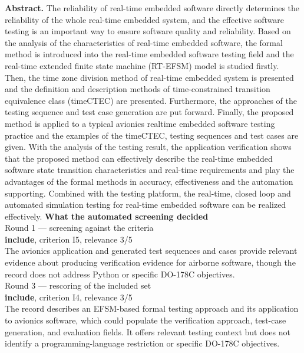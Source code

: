 \documentclass[11pt,a4paper]{article}
\begin{document}
{\small\textbf{Abstract.} The reliability of real-time embedded software directly determines the reliability of the whole real-time embedded system, and the effective software testing is an important way to ensure software quality and reliability. Based on the analysis of the characteristics of real-time embedded software, the formal method is introduced into the real-time embedded software testing field and the real-time extended finite state machine (RT-EFSM) model is studied firstly. Then, the time zone division method of real-time embedded system is presented and the definition and description methods of time-constrained transition equivalence class (timeCTEC) are presented. Furthermore, the approaches of the testing sequence and test case generation are put forward. Finally, the proposed method is applied to a typical avionics realtime embedded software testing practice and the examples of the timeCTEC, testing sequences and test cases are given. With the analysis of the testing result, the application verification shows that the proposed method can effectively describe the real-time embedded software state transition characteristics and real-time requirements and play the advantages of the formal methods in accuracy, effectiveness and the automation supporting. Combined with the testing platform, the real-time, closed loop and automated simulation testing for real-time embedded software can be realized effectively.}
\vspace{3mm}
\vspace{2.5mm}
{\small\textbf{What the automated screening decided}}\\[2mm]
{\footnotesize\color{soft}Round 1 --- screening against the criteria}\\[0.5mm]
{\small\textbf{include}, criterion I5, relevance 3/5}\\[0.5mm]
{\small The avionics application and generated test sequences and cases provide relevant evidence about producing verification evidence for airborne software, though the record does not address Python or specific DO-178C objectives.}\\[2.5mm]
{\footnotesize\color{soft}Round 3 --- rescoring of the included set}\\[0.5mm]
{\small\textbf{include}, criterion I4, relevance 3/5}\\[0.5mm]
{\small The record describes an EFSM-based formal testing approach and its application to avionics software, which could populate the verification approach, test-case generation, and evaluation fields. It offers relevant testing context but does not identify a programming-language restriction or specific DO-178C objectives.}\\[2.5mm]
\end{document}
